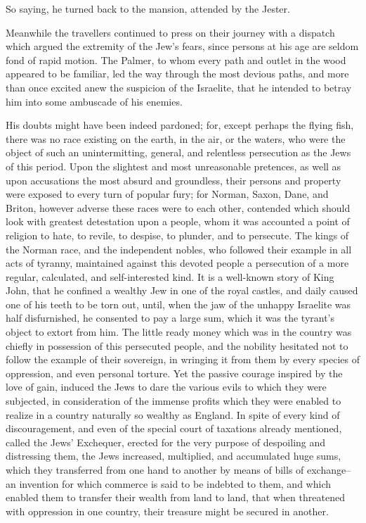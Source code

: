 So saying, he turned back to the mansion, attended by the Jester.

Meanwhile the travellers continued to press on their journey with a
dispatch which argued the extremity of the Jew's fears, since persons at
his age are seldom fond of rapid motion. The Palmer, to whom every path
and outlet in the wood appeared to be familiar, led the way through the
most devious paths, and more than once excited anew the suspicion of the
Israelite, that he intended to betray him into some ambuscade of his
enemies.

His doubts might have been indeed pardoned; for, except perhaps the
flying fish, there was no race existing on the earth, in the air, or the
waters, who were the object of such an unintermitting, general, and
relentless persecution as the Jews of this period. Upon the slightest
and most unreasonable pretences, as well as upon accusations the most
absurd and groundless, their persons and property were exposed to every
turn of popular fury; for Norman, Saxon, Dane, and Briton, however
adverse these races were to each other, contended which should look with
greatest detestation upon a people, whom it was accounted a point of
religion to hate, to revile, to despise, to plunder, and to persecute.
The kings of the Norman race, and the independent nobles, who followed
their example in all acts of tyranny, maintained against this devoted
people a persecution of a more regular, calculated, and self-interested
kind. It is a well-known story of King John, that he confined a wealthy
Jew in one of the royal castles, and daily caused one of his teeth to be
torn out, until, when the jaw of the unhappy Israelite was half
disfurnished, he consented to pay a large sum, which it was the tyrant's
object to extort from him. The little ready money which was in the
country was chiefly in possession of this persecuted people, and the
nobility hesitated not to follow the example of their sovereign, in
wringing it from them by every species of oppression, and even personal
torture. Yet the passive courage inspired by the love of gain, induced
the Jews to dare the various evils to which they were subjected, in
consideration of the immense profits which they were enabled to realize
in a country naturally so wealthy as England. In spite of every kind of
discouragement, and even of the special court of taxations already
mentioned, called the Jews' Exchequer, erected for the very purpose of
despoiling and distressing them, the Jews increased, multiplied, and
accumulated huge sums, which they transferred from one hand to another
by means of bills of exchange--an invention for which commerce is said
to be indebted to them, and which enabled them to transfer their wealth
from land to land, that when threatened with oppression in one country,
their treasure might be secured in another.

